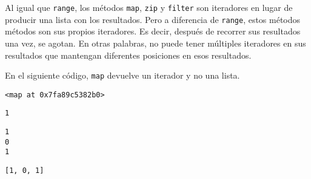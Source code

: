 Al igual que \texttt{range}, los métodos \texttt{map}, \texttt{zip} y
\texttt{filter} son iteradores en lugar de producir una lista con los
resultados. Pero a diferencia de \texttt{range}, estos métodos métodos
son sus propios iteradores. Es decir, después de recorrer sus resultados
una vez, se agotan. En otras palabras, no puede tener múltiples
iteradores en sus resultados que mantengan diferentes posiciones en esos
resultados.
\\

\begin{code} En el siguiente código, \texttt{map} devuelve un iterador y no una lista.

\begin{Shaded}
\begin{Highlighting}[]
\OperatorTok{=} \NormalTok{(}\NormalTok{, (}\OperatorTok{{-}}\NormalTok{, }\NormalTok{, }\NormalTok{))}
\end{Highlighting}
\end{Shaded}

\begin{verbatim}
<map at 0x7fa89c5382b0>
\end{verbatim}

\begin{Shaded}
\begin{Highlighting}[]
\end{Highlighting}
\end{Shaded}

\begin{verbatim}
1
\end{verbatim}

\begin{Shaded}
\begin{Highlighting}[]
\OperatorTok{=} \NormalTok{(}\NormalTok{, (}\OperatorTok{{-}}\NormalTok{, }\NormalTok{, }\NormalTok{))}

\end{Highlighting}
\end{Shaded}

\begin{verbatim}
1
0
1
\end{verbatim}

\begin{Shaded}
\begin{Highlighting}[]
\OperatorTok{=} \NormalTok{(}\NormalTok{, (}\OperatorTok{{-}}\NormalTok{, }\NormalTok{, }\NormalTok{))}
\end{Highlighting}
\end{Shaded}

\begin{verbatim}
[1, 0, 1]
\end{verbatim}
\end{code}

